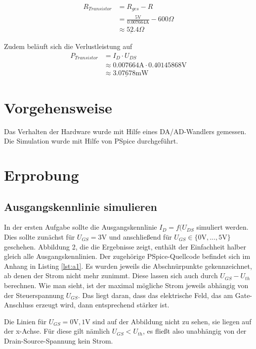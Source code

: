 \documentclass[12pt,a4paper]{scrartcl}
\begin{document}
\begin{align*}
R_{Transistor} & = R_{ges} - R \\
& = \frac{5\text{V}}{0.007664\text{A}} - 600\Omega\\
& \underline{\approx 52.4\Omega}
\end{align*}

Zudem bel\"auft sich die Verlustleistung auf 
\begin{align*}
P_{Transistor} & = I_D \cdot U_{DS} \\
& \approx 0.007664\text{A} \cdot 0.40145868\text{V} \\
& \underline{\approx 3.07678\text{mW}}
\end{align*}

\section{Vorgehensweise}
Das Verhalten der Hardware wurde mit Hilfe eines DA/AD-Wandlers gemessen.
Die Simulation wurde mit Hilfe von PSpice durchgef\"uhrt.

\section{Erprobung}
\subsection{Ausgangskennlinie simulieren}
In der ersten Aufgabe sollte die Ausgangskennlinie $I_D = f(U_{DS}$ simuliert werden.
Dies sollte zun\"achst f\"ur $U_{GS} = 3$V und anschlie\ss end f\"ur $U_{GS} \in \{0\text{V}, ..., 5\text{V}\}$ geschehen.
Abbildung 2, die die Ergebnisse zeigt, enth\"alt der Einfachheit halber gleich alle Ausgangskennlinien.
Der zugeh\"orige PSpice-Quellcode befindet sich im Anhang in Listing \ref{lst:a1}.
Es wurden jeweils die Abschn\"urpunkte gekennzeichnet, ab denen der Strom nicht mehr zunimmt.
Diese lassen sich auch durch $U_{GS}-U_{th}$ berechnen.
Wie man sieht, ist der maximal m\"ogliche Strom jeweils abh\"angig von der Steuerspannung $U_{GS}$.
Das liegt daran, dass das elektrische Feld, das am Gate-Anschluss erzeugt wird, dann entsprechend st\"arker ist.

Die Linien f\"ur $U_{GS} = 0\text{V}, 1$V sind auf der Abbildung nicht zu sehen, sie liegen auf der x-Achse.
F\"ur diese gilt n\"amlich $U_{GS} < U_{th}$, es flie\ss t also unabh\"angig von der Drain-Source-Spannung kein Strom.
\end{document}
